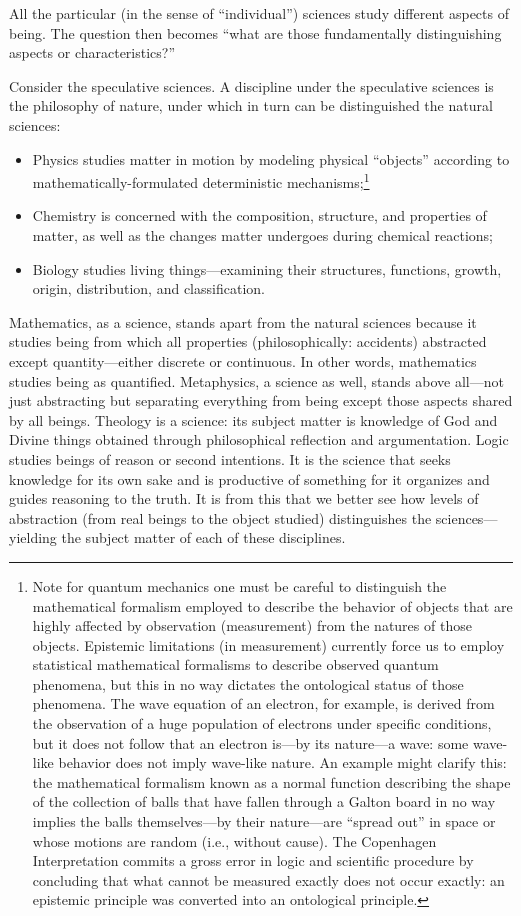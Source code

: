All the particular (in the sense of “individual”) sciences study different aspects of being. The question then becomes “what are those fundamentally distinguishing aspects or characteristics?”

Consider the speculative sciences. A discipline under the speculative sciences is the philosophy of nature, under which in turn can be distinguished the natural sciences:

\begin{itemize}
\item Physics studies matter in motion by modeling physical “objects” according to mathematically-formulated deterministic mechanisms;\footnote{Note for quantum mechanics one must be careful to distinguish the mathematical formalism employed to describe the behavior of objects that are highly affected by observation (measurement) from the natures of those objects. Epistemic limitations (in measurement) currently force us to employ statistical mathematical formalisms to describe observed quantum phenomena, but this in no way dictates the ontological status of those phenomena. The wave equation of an electron, for example, is derived from the observation of a huge population of electrons under specific conditions, but it does not follow that an electron is—by its nature—a wave: some wave-like behavior does not imply wave-like nature. An example might clarify this: the mathematical formalism known as a normal function describing the shape of the collection of balls that have fallen through a Galton board in no way implies the balls themselves—by their nature—are “spread out” in space or whose motions are random (i.e., without cause). The Copenhagen Interpretation commits a gross error in logic and scientific procedure by concluding that what cannot be measured exactly does not occur exactly: an epistemic principle was converted into an ontological principle.}
\item Chemistry is concerned with the composition, structure, and properties of matter, as well as the changes matter undergoes during chemical reactions;
\item Biology studies living things—examining their structures, functions, growth, origin, distribution, and classification.
\end{itemize}

Mathematics, as a science, stands apart from the natural sciences because it studies being from which all properties (philosophically: accidents) abstracted except quantity—either discrete or continuous. In other words, mathematics studies being as quantified. Metaphysics, a science as well, stands above all—not just abstracting but separating everything from being except those aspects shared by all beings. Theology is a science: its subject matter is knowledge of God and Divine things obtained through philosophical reflection and argumentation. Logic studies beings of reason or second intentions. It is the science that seeks knowledge for its own sake and is productive of something for it organizes and guides reasoning to the truth. It is from this that we better see how levels of abstraction (from real beings to the object studied) distinguishes the sciences—yielding the subject matter of each of these disciplines.


